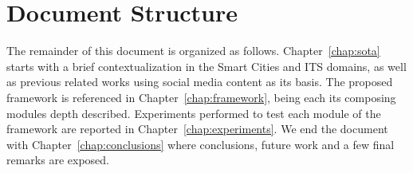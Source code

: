 


\section{Document Structure}\label{sec:doc_structure}
The remainder of this document is organized as follows.
Chapter~\ref{chap:sota} starts with a brief contextualization in the Smart Cities and \gls{ITS} domains, as well as previous related works using social media content as its basis.
The proposed framework is referenced in Chapter~\ref{chap:framework}, being each its composing modules depth described.
Experiments performed to test each module of the framework are reported in Chapter~\ref{chap:experiments}.
We end the document with Chapter~\ref{chap:conclusions} where conclusions, future work and a few final remarks are exposed.